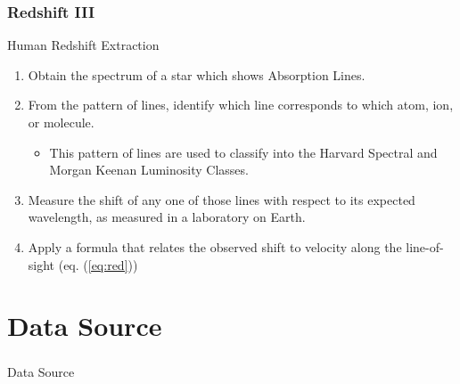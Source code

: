 \documentclass[aspectratio=169]{beamer}
\begin{document}
\begin{frame}
\frametitle{Redshift III}

\vspace{-0.5cm}
	Human Redshift Extraction
	\begin{enumerate}
	\item Obtain the spectrum of a star which shows Absorption Lines.
	\item From the pattern of lines, identify which line corresponds to which atom, ion, or molecule.
		\begin{itemize}
		\item This pattern of lines are used to classify into the Harvard Spectral and Morgan Keenan Luminosity Classes.
		\end{itemize}
	\item Measure the shift of any one of those lines with respect to its expected wavelength, as measured in a laboratory on Earth.
	\item Apply a formula that relates the observed shift to velocity along the line-of-sight (eq. (\ref{eq:red}))
	\end{enumerate}


\end{frame}



\section{Data Source}

\begin{frame}
\frametitle{}

\begin{center}
\LARGE
Data Source
\end{center}
\end{frame}

\end{document}
